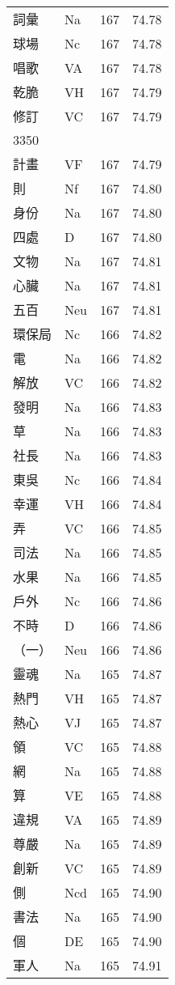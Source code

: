\documentclass[twocolumn]{book}
\begin{document}
\begin{supertabular}{llrr}
詞彙 & Na & 167 &  74.78\\
球場 & Nc & 167 &  74.78\\
唱歌 & VA & 167 &  74.78\\
乾脆 & VH & 167 &  74.79\\
修訂 & VC & 167 &  74.79\\
3350\\
計畫 & VF & 167 &  74.79\\
則 & Nf & 167 &  74.80\\
身份 & Na & 167 &  74.80\\
四處 & D & 167 &  74.80\\
文物 & Na & 167 &  74.81\\
心臟 & Na & 167 &  74.81\\
五百 & Neu & 167 &  74.81\\
環保局 & Nc & 166 &  74.82\\
電 & Na & 166 &  74.82\\
解放 & VC & 166 &  74.82\\
發明 & Na & 166 &  74.83\\
草 & Na & 166 &  74.83\\
社長 & Na & 166 &  74.83\\
東吳 & Nc & 166 &  74.84\\
幸運 & VH & 166 &  74.84\\
弄 & VC & 166 &  74.85\\
司法 & Na & 166 &  74.85\\
水果 & Na & 166 &  74.85\\
戶外 & Nc & 166 &  74.86\\
不時 & D & 166 &  74.86\\
（一） & Neu & 166 &  74.86\\
靈魂 & Na & 165 &  74.87\\
熱門 & VH & 165 &  74.87\\
熱心 & VJ & 165 &  74.87\\
領 & VC & 165 &  74.88\\
網 & Na & 165 &  74.88\\
算 & VE & 165 &  74.88\\
違規 & VA & 165 &  74.89\\
尊嚴 & Na & 165 &  74.89\\
創新 & VC & 165 &  74.89\\
側 & Ncd & 165 &  74.90\\
書法 & Na & 165 &  74.90\\
個 & DE & 165 &  74.90\\
軍人 & Na & 165 &  74.91\\

\end{supertabular}
\end{document}
